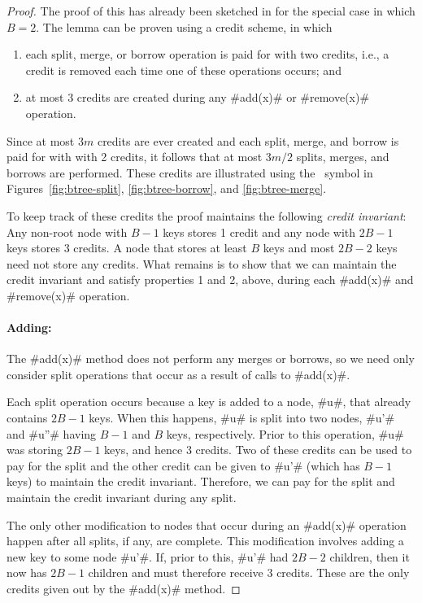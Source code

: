 \begin{proof}
   The proof of this has already been sketched in
    for the special case in which $B=2$.
   The lemma can be proven using a credit scheme, in which
  \begin{enumerate}
    \item each split, merge, or borrow operation is paid for with two
      credits, i.e., a credit is removed each time one of these operations
      occurs; and
    \item at most 3 credits are created during any #add(x)# or
      #remove(x)# operation.
  \end{enumerate}
  Since at most $3m$ credits are ever created and each split,
  merge, and borrow is paid for with with 2 credits, it follows
  that at most $3m/2$ splits, merges, and borrows are performed.
  These credits are illustrated using the \textcent\ symbol in
  Figures~\ref{fig:btree-split}, \ref{fig:btree-borrow}, and
  \ref{fig:btree-merge}.

  To keep track of these credits the proof maintains the following
  \emph{credit invariant}: Any non-root node with $B-1$ keys stores
  1 credit and any node with $2B-1$ keys stores 3 credits.  A node
  that stores at least $B$ keys and most $2B-2$ keys need not store
  any credits.  What remains is to show that we can maintain the credit
  invariant and satisfy properties 1 and 2, above, during each #add(x)#
  and #remove(x)# operation.

  \paragraph{Adding:}
  The #add(x)# method does not perform any merges or borrows, so we
  need only consider split operations that occur as a result of calls
  to #add(x)#.

  Each split operation occurs because a key is added to a node,
  #u#, that already contains $2B-1$ keys.  When this happens, #u#
  is split into two nodes, #u'# and #u''# having $B-1$ and $B$ keys,
  respectively.  Prior to this operation, #u# was storing $2B-1$ keys,
  and hence 3 credits.  Two of these credits can be used to pay for the
  split and the other credit can be given to #u'# (which has $B-1$ keys)
  to maintain the credit invariant.  Therefore, we can pay for the split
  and maintain the credit invariant during any split.

  The only other modification to nodes that occur during an #add(x)#
  operation happen after all splits, if any, are complete.  This
  modification involves adding a new key to some node #u'#.  If, prior
  to this, #u'# had $2B-2$ children, then it now has $2B-1$ children and
  must therefore receive 3 credits.  These are the only credits given
  out by the #add(x)# method.


\end{proof}
